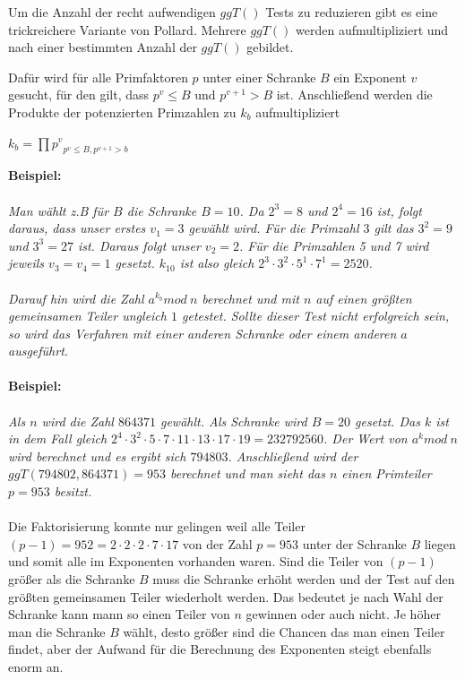 \documentclass[a4paper,11pt]{article}
\begin{document}
Um die Anzahl der recht aufwendigen $ggT()$ Tests zu reduzieren gibt es eine trickreichere Variante von
Pollard. Mehrere $ggT()$ werden aufmultipliziert und nach einer bestimmten Anzahl der $ggT()$ gebildet.

Dafür wird für alle Primfaktoren $p$ unter einer Schranke $B$ ein Exponent $v$ gesucht, für den
gilt, dass $p^v \leq B$ und $p^{v+1} > B $ ist. Anschließend werden die Produkte der potenzierten
Primzahlen zu $k_b$ aufmultipliziert
\begin{center}
$k_b = \prod{p^v}_{p^v\leq B, p^{v+1}>b}$
\end{center}
\textbf{Beispiel:}\\\\
{\it
Man wählt z.B für $B$ die Schranke $B=10$. Da $2^3 = 8$ und $2^4 = 16$ ist, folgt daraus, dass unser
erstes $v_1 = 3$ gewählt wird. Für die Primzahl $3$ gilt das $3^2 = 9$ und $3^3 = 27$ ist. Daraus
folgt unser $v_2 = 2$. Für die Primzahlen 5 und 7 wird jeweils $v_3 = v_4 = 1$ gesetzt. $k_{10}$ ist
also gleich $2^3\cdot3^2\cdot5^1\cdot7^1=2520$.\\\\
Darauf hin wird die Zahl $a^{k_b} mod\ n$ berechnet und mit $n$ auf einen größten gemeinsamen Teiler
ungleich $1$ getestet. Sollte dieser Test nicht erfolgreich sein, so wird das Verfahren mit einer
anderen Schranke oder einem anderen $a$ ausgeführt.\\\\
}
\textbf{Beispiel:}\\\\
{\it
Als $n$ wird die Zahl $864371$ gewählt. Als Schranke wird $B=20$ gesetzt. Das $k$ ist in dem Fall
gleich $2^4\cdot3^2\cdot5\cdot7\cdot11\cdot13\cdot17\cdot19 = 232792560$. Der Wert von $a^k mod\ n$
wird berechnet und es ergibt sich $794803$. Anschließend wird der $ggT(794802, 864371) = 953$ berechnet
und man sieht das $n$ einen Primteiler $p = 953$ besitzt.\\\\
}
Die Faktorisierung konnte nur gelingen weil alle Teiler $(p-1) = 952 = 2\cdot2\cdot2\cdot7\cdot17$
von der Zahl $p = 953$ unter der Schranke $B$ liegen und somit alle im Exponenten vorhanden waren. Sind die Teiler von $(p-1)$ größer als die Schranke $B$ muss die Schranke erhöht werden und der Test auf den größten
gemeinsamen Teiler wiederholt werden. Das bedeutet je nach Wahl der Schranke kann mann so einen
Teiler von $n$ gewinnen oder auch nicht. Je höher man die Schranke $B$ wählt, desto größer
sind die Chancen das man einen Teiler findet, aber der Aufwand für die Berechnung des Exponenten
steigt ebenfalls enorm an.
\end{document}
